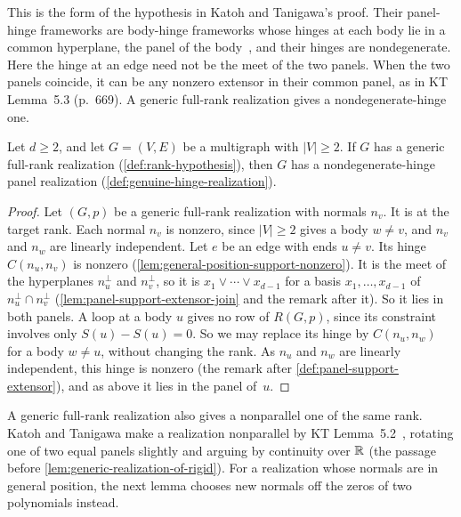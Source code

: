 This is the form of the hypothesis in Katoh and Tanigawa's proof. Their
panel-hinge frameworks are body-hinge frameworks whose hinges at each
body lie in a common hyperplane, the panel of the
body~\cite[p.~668]{katohTanigawa2011}, and their hinges are
nondegenerate. Here the hinge at an edge need not be the meet of the
two panels. When the two panels coincide, it can be any nonzero extensor
in their common panel, as in KT Lemma~5.3 (p.~669). A generic full-rank
realization gives a nondegenerate-hinge one.

\begin{lemma}
  \label{lem:generic-yields-genuine-hinge}
  \leanok
  Let $d \ge 2$, and let $G = (V, E)$ be a multigraph with $|V| \ge 2$.
  If $G$ has a generic full-rank realization (\cref{def:rank-hypothesis}),
  then $G$ has a nondegenerate-hinge panel realization
  (\cref{def:genuine-hinge-realization}).
\end{lemma}
\begin{proof}
  \leanok
  Let $(G,p)$ be a generic full-rank realization with normals $n_v$. It
  is at the target rank. Each normal $n_v$ is nonzero, since $|V| \ge 2$
  gives a body $w \neq v$, and $n_v$ and $n_w$ are linearly independent.
  Let $e$ be an edge with ends $u \neq v$. Its hinge $C(n_u, n_v)$ is
  nonzero (\cref{lem:general-position-support-nonzero}). It is the meet
  of the hyperplanes $n_u^\perp$ and $n_v^\perp$, so it is
  $x_1 \vee \cdots \vee x_{d-1}$ for a basis $x_1, \dots, x_{d-1}$ of
  $n_u^\perp \cap n_v^\perp$ (\cref{lem:panel-support-extensor-join} and
  the remark after it). So it lies in both panels. A loop
  at a body $u$ gives no row of $R(G,p)$, since its constraint involves
  only $S(u) - S(u) = 0$. So we may replace its hinge by $C(n_u, n_w)$
  for a body $w \neq u$, without changing the rank. As $n_u$ and $n_w$
  are linearly independent, this hinge is nonzero (the remark after
  \cref{def:panel-support-extensor}), and as above it lies in the panel
  of~$u$.
\end{proof}

A generic full-rank realization also gives a nonparallel one of the same
rank. Katoh and Tanigawa make a realization nonparallel by KT
Lemma~5.2~\cite[p.~669]{katohTanigawa2011}, rotating one of two equal
panels slightly and arguing by continuity over ${\mathbb{R}}$ (the passage before
\cref{lem:generic-realization-of-rigid}). For a realization whose
normals are in general position, the next lemma chooses new normals
off the zeros of two polynomials instead.

